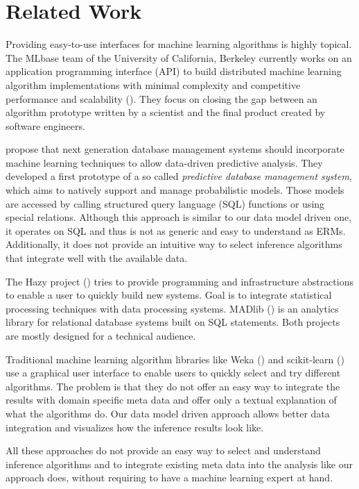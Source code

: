 \section{Related Work}

Providing easy-to-use interfaces for machine learning algorithms is highly topical. The MLbase team of the University of California, Berkeley currently works on an application programming interface (API) to build distributed machine learning algorithm implementations with minimal complexity and competitive performance and scalability (\cite{sparks2013mli}). They focus on closing the gap between an algorithm prototype written by a scientist and the final product created by software engineers.

\textcite{akdere2011case} propose that next generation database management systems should incorporate machine learning techniques to allow data-driven predictive analysis. They developed a first prototype of a so called \emph{predictive database management system}, which aims to natively support and manage probabilistic models. Those models are accessed by calling structured query language (SQL) functions or using special relations. Although this approach is similar to our data model driven one, it operates on SQL and thus is not as generic and easy to understand as ERMs. Additionally, it does not provide an intuitive way to select inference algorithms that integrate well with the available data.

The Hazy project (\cite{kumar2013hazy}) tries to provide programming and infrastructure abstractions to enable a user to quickly build new systems. Goal is to integrate statistical processing techniques with data processing systems. MADlib (\cite{hellerstein2012madlib}) is an analytics library for relational database systems built on SQL statements. Both projects are mostly designed for a technical audience.

Traditional machine learning algorithm libraries like Weka (\cite{hall2009weka}) and scikit-learn (\cite{scikit-learn}) use a graphical user interface to enable users to quickly select and try different algorithms. The problem is that they do not offer an easy way to integrate the results with domain specific meta data and offer only a textual explanation of what the algorithms do. Our data model driven approach allows better data integration and visualizes how the inference results look like.

All these approaches do not provide an easy way to select and understand inference algorithms and to integrate existing meta data into the analysis like our approach does, without requiring to have a machine learning expert at hand.
